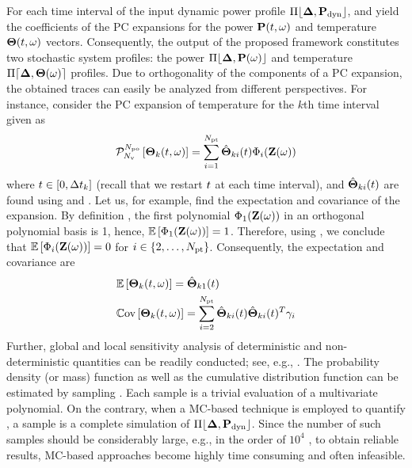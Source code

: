 For each time interval of the input dynamic power profile $\profPdyn$,  and  yield the coefficients of the PC expansions for the power $\mathbf{P}(t, \omega)$ and temperature ${\boldsymbol\Theta}(t, \omega)$ vectors. Consequently, the output of the proposed framework constitutes two stochastic system profiles: the power $\profP{\o}$ and temperature $\profT{\o}$ profiles. Due to orthogonality of the components of a PC expansion, the obtained traces can easily be analyzed from different perspectives. For instance, consider the PC expansion of temperature for the $k$th time interval given as
\begin{equation} \elabel{pc-k}
  \oPC{\vars}{\pcorder}{\vTO_k(\t, \o)} = \sum_{i = 1}^{\pcterms} \pcc{\vTO}_{ki}(\t) \pcb_i(\vZ(\o))
\end{equation}
where $t \in [0, \Delta t_k]$ (recall that we restart $t$ at each time interval), and $\hat{{\boldsymbol\Theta}}_{ki}(t)$ are found using  and . Let us, for example, find the expectation and covariance of the expansion. By definition \cite{xiu2010}, the first polynomial $\Phi_1(\mathbf{Z}(\omega))$ in an orthogonal polynomial basis is 1, hence, $\mathbb{E}\left[\Phi_1(\mathbf{Z}(\omega))\right] = 1$. Therefore, using , we conclude that $\mathbb{E}\left[\Phi_i(\mathbf{Z}(\omega))\right] = 0$ for $i \in \{ 2, \dotsc, {N_\text{pt}} \}$. Consequently, the expectation and covariance are
\begin{align*}
  & \mathbb{E}\left[{\boldsymbol\Theta}_k(t, \omega)\right] = \hat{{\boldsymbol\Theta}}_{k1}(t) \\
  & \mathbb{C}\text{ov}\left[{\boldsymbol\Theta}_k(t, \omega)\right] = \sum_{i = 2}^{{N_\text{pt}}} \hat{{\boldsymbol\Theta}}_{ki}(t) \hat{{\boldsymbol\Theta}}_{ki}(t)^T \gamma_i
\end{align*}
Further, global and local sensitivity analysis of deterministic and non-deterministic quantities can be readily conducted; see, e.g., \cite{eldred2009, maitre2010}. The probability density (or mass) function as well as the cumulative distribution function can be estimated by sampling . Each sample is a trivial evaluation of a multivariate polynomial. On the contrary, when a MC-based technique is employed to quantify , a sample is a complete simulation of $\profPdyn$. Since the number of such samples should be considerably large, e.g., in the order of $10^4$ \cite{xiu2010}, to obtain reliable results, MC-based approaches become highly time consuming and often infeasible.
